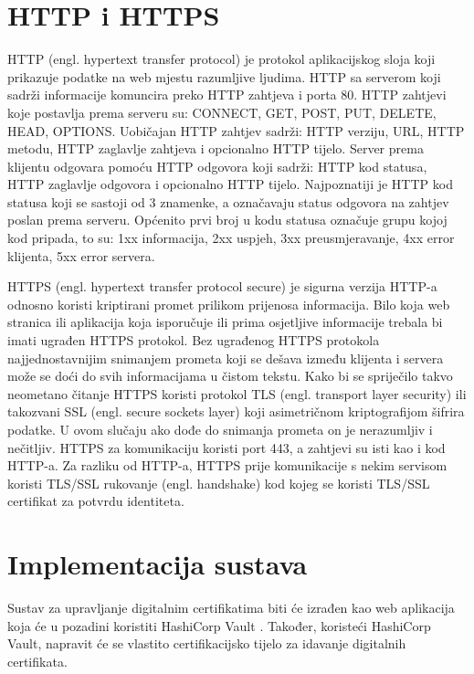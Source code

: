 \documentclass[]{foi}
\begin{document}
\chapter{HTTP i HTTPS}

HTTP (engl. hypertext transfer protocol) je protokol aplikacijskog sloja koji prikazuje podatke na web mjestu razumljive ljudima.
HTTP sa serverom koji sadrži informacije komuncira preko HTTP zahtjeva i porta 80.
HTTP zahtjevi koje postavlja prema serveru su: CONNECT, GET, POST, PUT, DELETE, HEAD, OPTIONS.
Uobičajan HTTP zahtjev sadrži: HTTP verziju, URL, HTTP metodu, HTTP zaglavlje zahtjeva i opcionalno HTTP tijelo.
Server prema klijentu odgovara pomoću HTTP odgovora koji sadrži: HTTP kod statusa, HTTP zaglavlje odgovora i opcionalno HTTP tijelo.
Najpoznatiji je HTTP kod statusa koji se sastoji od 3 znamenke, a označavaju status odgovora na zahtjev poslan prema serveru.
Općenito prvi broj u kodu statusa označuje grupu kojoj kod pripada, to su: 1xx informacija, 2xx uspjeh, 3xx preusmjeravanje, 4xx error klijenta, 5xx error servera.
\cite{cloudflare-http}

HTTPS (engl. hypertext transfer protocol secure) je sigurna verzija HTTP-a odnosno koristi kriptirani promet prilikom prijenosa informacija.
Bilo koja web stranica ili aplikacija koja isporučuje ili prima osjetljive informacije trebala bi imati ugrađen HTTPS protokol.
Bez ugrađenog HTTPS protokola najjednostavnijim snimanjem prometa koji se dešava između klijenta i servera može se doći do svih informacijama u čistom tekstu.
Kako bi se spriječilo takvo neometano čitanje HTTPS koristi protokol TLS (engl. transport layer security) ili takozvani SSL (engl. secure sockets layer) koji asimetričnom kriptografijom šifrira podatke.
U ovom slučaju ako dođe do snimanja prometa on je nerazumljiv i nečitljiv.
HTTPS za komunikaciju koristi port 443, a zahtjevi su isti kao i kod HTTP-a.
Za razliku od HTTP-a, HTTPS prije komunikacije s nekim servisom koristi TLS/SSL rukovanje (engl. handshake) kod kojeg se koristi TLS/SSL certifikat za potvrdu identiteta.
\cite{cloudflare-https}

\chapter{Implementacija sustava}

Sustav za upravljanje digitalnim certifikatima biti će izrađen kao web aplikacija koja će u pozadini koristiti HashiCorp Vault \cite{hashicorp-vault-what-is}.
Također, koristeći HashiCorp Vault, napravit će se vlastito certifikacijsko tijelo za idavanje digitalnih certifikata.
\end{document}
